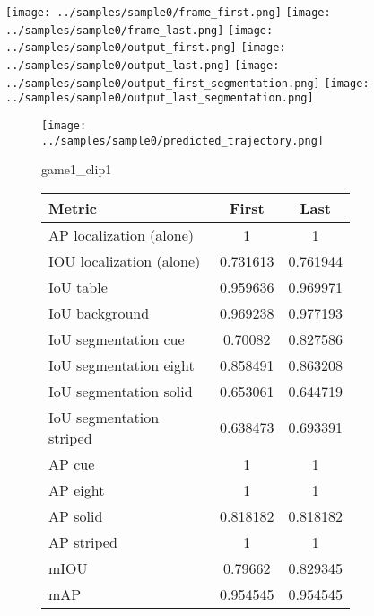 \begin{figure}
\texttt{[image: ../samples/sample0/frame\_first.png]}
\texttt{[image: ../samples/sample0/frame\_last.png]}
\newline
\texttt{[image: ../samples/sample0/output\_first.png]}
\texttt{[image: ../samples/sample0/output\_last.png]}
\newline
\texttt{[image: ../samples/sample0/output\_first\_segmentation.png]}
\texttt{[image: ../samples/sample0/output\_last\_segmentation.png]}
\newline
\begin{subfigure}[b]{0.49\textwidth}
    \vspace{20pt}
    \texttt{[image: ../samples/sample0/predicted\_trajectory.png]}
    \caption*{game1\_clip1}
\end{subfigure}
\begin{subfigure}[b]{0.49\textwidth}
\begin{tabular}{|l|c|c|}
    \hline
    \textbf{Metric} & \textbf{First} & \textbf{Last} \\
    \hline
    AP localization (alone) & 1 & 1 \\ 
    IOU localization (alone) & 0.731613 & 0.761944 \\ 
    \hline
    IoU table & 0.959636 & 0.969971 \\ 
    IoU background & 0.969238 & 0.977193 \\ 
    \hline
    IoU segmentation cue & 0.70082 & 0.827586 \\ 
    IoU segmentation eight & 0.858491 & 0.863208 \\ 
    IoU segmentation solid & 0.653061 & 0.644719 \\ 
    IoU segmentation striped & 0.638473 & 0.693391 \\ 
    \hline
    AP cue & 1 & 1 \\ 
    AP eight & 1 & 1 \\ 
    AP solid & 0.818182 & 0.818182 \\ 
    AP striped & 1 & 1 \\ 
    \hline
    mIOU & 0.79662 & 0.829345 \\ 
    mAP & 0.954545 & 0.954545 \\ 
    \hline
\end{tabular}
\end{subfigure}
\end{figure}

